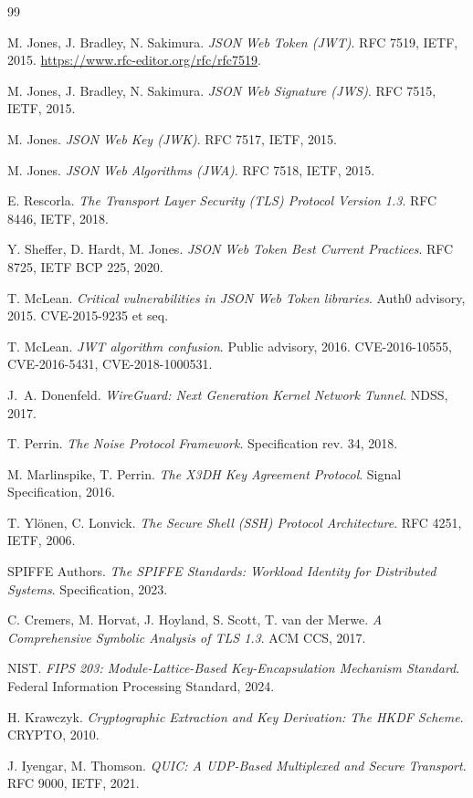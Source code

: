 \documentclass[11pt,a4paper]{article}
\theoremstyle{plain}
\theoremstyle{definition}
\begin{document}
\begin{thebibliography}{99}

 M. Jones, J. Bradley, N. Sakimura.
  \emph{JSON Web Token (JWT)}. RFC 7519, IETF, 2015.
  \url{https://www.rfc-editor.org/rfc/rfc7519}.

 M. Jones, J. Bradley, N. Sakimura.
  \emph{JSON Web Signature (JWS)}. RFC 7515, IETF, 2015.

 M. Jones.
  \emph{JSON Web Key (JWK)}. RFC 7517, IETF, 2015.

 M. Jones.
  \emph{JSON Web Algorithms (JWA)}. RFC 7518, IETF, 2015.

 E. Rescorla.
  \emph{The Transport Layer Security (TLS) Protocol Version 1.3}.
  RFC 8446, IETF, 2018.

 Y. Sheffer, D. Hardt, M. Jones.
  \emph{JSON Web Token Best Current Practices}. RFC 8725, IETF BCP 225, 2020.

 T. McLean.
  \emph{Critical vulnerabilities in JSON Web Token libraries}.
  Auth0 advisory, 2015. CVE-2015-9235 et seq.

 T. McLean.
  \emph{JWT algorithm confusion}. Public advisory, 2016.
  CVE-2016-10555, CVE-2016-5431, CVE-2018-1000531.

 J.~A. Donenfeld.
  \emph{WireGuard: Next Generation Kernel Network Tunnel}. NDSS, 2017.

 T. Perrin.
  \emph{The Noise Protocol Framework}. Specification rev. 34, 2018.

 M. Marlinspike, T. Perrin.
  \emph{The X3DH Key Agreement Protocol}. Signal Specification, 2016.

 T. Yl\"onen, C. Lonvick.
  \emph{The Secure Shell (SSH) Protocol Architecture}. RFC 4251, IETF, 2006.

 SPIFFE Authors.
  \emph{The SPIFFE Standards: Workload Identity for Distributed Systems}.
  Specification, 2023.

 C. Cremers, M. Horvat, J. Hoyland, S. Scott,
  T. van der Merwe. \emph{A Comprehensive Symbolic Analysis of TLS 1.3}.
  ACM CCS, 2017.

 NIST.
  \emph{FIPS 203: Module-Lattice-Based Key-Encapsulation Mechanism Standard}.
  Federal Information Processing Standard, 2024.

 H. Krawczyk.
  \emph{Cryptographic Extraction and Key Derivation: The HKDF Scheme}.
  CRYPTO, 2010.

 J. Iyengar, M. Thomson.
  \emph{QUIC: A UDP-Based Multiplexed and Secure Transport}. RFC 9000,
  IETF, 2021.

\end{thebibliography}
\end{document}
